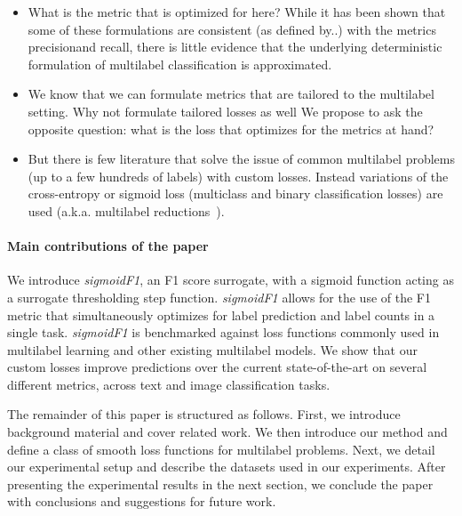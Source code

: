 \begin{itemize}[leftmargin=*,nosep]
\item{What is the metric that is optimized for here? While it has been shown that some of these formulations are consistent (as defined by..) with the metrics precision\@K and recall\@K, there is little evidence that the underlying deterministic formulation of multilabel classification is approximated.}
\item{We know that we can formulate metrics that are tailored to the multilabel setting. Why not formulate tailored losses as well
We propose to ask the opposite question: what is the loss that optimizes for the metrics at hand?}
\item{But there is few literature that solve the issue of common multilabel problems (up to a few hundreds of labels) with custom losses. Instead variations of the cross-entropy or sigmoid loss (multiclass and binary classification losses) are used (a.k.a. multilabel reductions~\cite{multilabelReduction}).}
\end{itemize}
\fi

\paragraph{Main contributions of the paper}
We introduce \emph{sigmoidF1}, an F1 score surrogate, with a sigmoid function acting as a surrogate thresholding step function.
\emph{sigmoidF1} allows for the use of the F1 metric that simultaneously optimizes for label prediction and label counts in a single task.
\emph{sigmoidF1} is benchmarked against loss functions commonly used in multilabel learning and other existing multilabel models. We show that our custom losses improve predictions over the current state-of-the-art on several different metrics, across text and image classification tasks.

\vspace{0.5\baselineskip}
The remainder of this paper is structured as follows. First, we introduce background material and cover related work. We then introduce our method and define a class of smooth loss functions for multilabel problems. Next, we detail our experimental setup and describe the datasets used in our experiments. After presenting the experimental results in the next section, we conclude the paper with conclusions and suggestions for future work.





